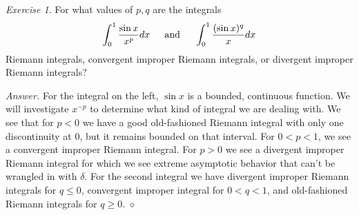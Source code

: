 \documentclass[12pt,oneside]{amsart}
\theoremstyle{definition}
\theoremstyle{remark}
\newtheorem{exer}{Exercise}
\numberwithin{equation}{exer}
\newenvironment{answer}{\bigskip\noindent\emph{Answer.}}{\hfill$\diamond$\newline}
\begin{document}
\newpage



\begin{exer}

For what values of $p,q$ are the integrals
\begin{align*}
    \int_0^1 \frac{\sin{x}}{x^p} dx \indent \text{and} \indent \int_0^1 \frac{(\sin{x})^q}{x}dx
\end{align*}
Riemann integrals, convergent improper Riemann integrals, or divergent improper Riemann integrals?

\end{exer}

\begin{answer}
For the integral on the left, $\sin{x}$ is a bounded, continuous function. We will investigate $x^{-p}$ to determine what kind of integral we are dealing with. We see that for $p<0$ we have a good old-fashioned Riemann integral with only one discontinuity at 0, but it remains bounded on that interval. For $0 < p < 1$, we see a convergent improper Riemann integral. For $p>0$ we see a divergent improper Riemann integral for which we see extreme asymptotic behavior that can't be wrangled in with $\delta$.
\newline \indent For the second integral we have divergent improper Riemann integrals for $q \leq0$, convergent improper integral for $0<q<1$, and old-fashioned Riemann integrals for $q\geq0$.
\end{answer}
\end{document}
